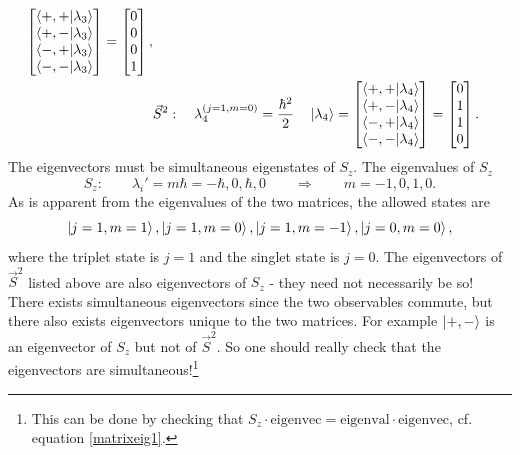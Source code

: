 \begin{example}
\begin{enumerate}
\begin{equation}
\begin{split}
\begin{bmatrix}
					\braket{+,+|\lambda_3} \\
					\braket{+,-|\lambda_3} \\
					\braket{-,+|\lambda_3} \\
					\braket{-,-|\lambda_3} \\
				\end{bmatrix}=\begin{bmatrix}
					0 \\
					0 \\
					0 \\
					1 \\
				\end{bmatrix},\\
				&\vec{S}^2: \quad\lambda_4^{(j=1,m=0)}=\frac{\hbar^2}{2}\quad  \ket{\lambda_4}=\begin{bmatrix}
					\braket{+,+|\lambda_4} \\
					\braket{+,-|\lambda_4} \\
					\braket{-,+|\lambda_4} \\
					\braket{-,-|\lambda_4} \\
				\end{bmatrix}=\begin{bmatrix}
					0 \\
					1 \\
					1 \\
					0 \\
				\end{bmatrix}.\\
			\end{split}
			\label{sing}
		\end{equation} 
		The eigenvectors must be simultaneous eigenstates of $S_z$. The eigenvalues of $S_z$
		\begin{equation}
			S_z:\qquad \lambda_i'=m\hbar=-\hbar,0,\hbar,0 \qquad \Rightarrow \qquad m=-1,0,1,0.
		\end{equation} 
		As is apparent from the eigenvalues of the two matrices, the allowed states are
		\begin{equation}
			\ket{j=1,m=1},\ket{j=1,m=0}, \ket{j=1,m=-1}, \ket{j=0,m=0},
		\end{equation} 
		where the triplet state is $j=1$ and the singlet state is $j=0$. The eigenvectors of $\vec{S}^2$ listed above are also eigenvectors of $S_z$ - they need not necessarily be so! There exists simultaneous eigenvectors since the two observables commute, but there also exists eigenvectors unique to the two matrices. For example $\ket{+,-}$ is an eigenvector of $S_z$ but not of $\vec{S}^2$. So one should really check that the eigenvectors are simultaneous!\footnote{This can be done by checking that $S_z\cdot \text{eigenvec}=\text{eigenval}\cdot \text{eigenvec}$, cf. equation \eqref{matrixeig1}.}\newline

\end{enumerate}
\end{example}
